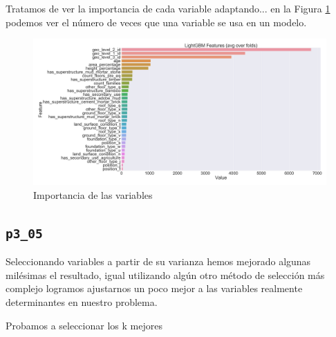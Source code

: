 \documentclass[a4paper, 20pt]{article}
\begin{document}
Tratamos de ver la importancia de cada variable adaptando...%
en la Figura \ref{fig:lgbm_imp_04} podemos ver el número de veces que una variable se usa en un modelo.
\begin{figure}[H]
    \centering
    \includegraphics[height=0.9\textwidth, width=1.0\textwidth]{lgbm_importances04}
    \caption{Importancia de las variables}
    \label{fig:lgbm_imp_04}
\end{figure}

\subsection{\texttt{p3\_05}}
Seleccionando variables a partir de su varianza hemos mejorado algunas milésimas el resultado, igual utilizando algún otro método de selección más complejo logramos ajustarnos un poco mejor a las variables realmente determinantes en nuestro problema.

Probamos a seleccionar los k mejores
\end{document}
